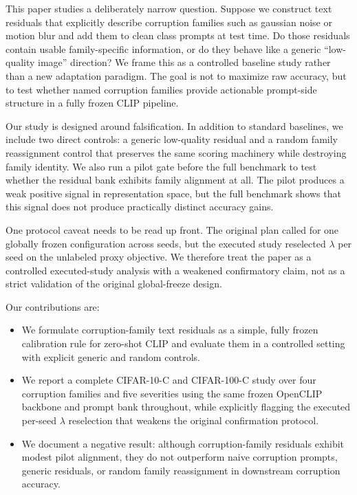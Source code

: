 \documentclass{article}
\begin{document}
This paper studies a deliberately narrow question. Suppose we construct text residuals that explicitly describe corruption families such as gaussian noise or motion blur and add them to clean class prompts at test time. Do those residuals contain usable family-specific information, or do they behave like a generic ``low-quality image'' direction? We frame this as a controlled baseline study rather than a new adaptation paradigm. The goal is not to maximize raw accuracy, but to test whether named corruption families provide actionable prompt-side structure in a fully frozen CLIP pipeline.

Our study is designed around falsification. In addition to standard baselines, we include two direct controls: a generic low-quality residual and a random family reassignment control that preserves the same scoring machinery while destroying family identity. We also run a pilot gate before the full benchmark to test whether the residual bank exhibits family alignment at all. The pilot produces a weak positive signal in representation space, but the full benchmark shows that this signal does not produce practically distinct accuracy gains.

One protocol caveat needs to be read up front. The original plan called for one globally frozen configuration across seeds, but the executed study reselected $\lambda$ per seed on the unlabeled proxy objective. We therefore treat the paper as a controlled executed-study analysis with a weakened confirmatory claim, not as a strict validation of the original global-freeze design.

Our contributions are:
\begin{itemize}
  \item We formulate corruption-family text residuals as a simple, fully frozen calibration rule for zero-shot CLIP and evaluate them in a controlled setting with explicit generic and random controls.
  \item We report a complete CIFAR-10-C and CIFAR-100-C study over four corruption families and five severities using the same frozen OpenCLIP backbone and prompt bank throughout, while explicitly flagging the executed per-seed $\lambda$ reselection that weakens the original confirmation protocol.
  \item We document a negative result: although corruption-family residuals exhibit modest pilot alignment, they do not outperform naive corruption prompts, generic residuals, or random family reassignment in downstream corruption accuracy.
\end{itemize}
\end{document}
